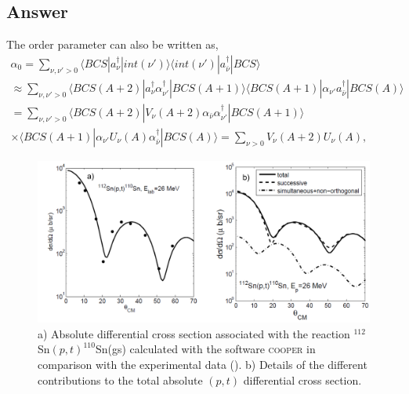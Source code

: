 \subsection*{Answer}
The order parameter can also be written as,
\begin{multline}
\alpha_0=\sum_{\nu,\nu'>0}\langle BCS |a^\dagger_{\nu}|int(\nu')\rangle\langle int(\nu')|a^\dagger_{\bar\nu}|BCS\rangle\\
\approx\sum_{\nu,\nu'>0}\langle BCS (A+2) |a^\dagger_{\nu}\alpha^\dagger_{\nu'}|BCS (A+1)\rangle\langle BCS (A+1)|\alpha_{\nu'}a^\dagger_{\bar\nu}|BCS (A)\rangle \\
=\sum_{\nu,\nu'>0}\langle BCS(A+2) |V_\nu(A+2)\alpha_{\bar\nu}\alpha^\dagger_{\nu'}|BCS(A+1)\rangle\\
\times\langle BCS(A+1)|\alpha_{\nu'}U_\nu(A)\alpha^\dagger_{\bar\nu}|BCS(A)\rangle
=\sum_{\nu>0}V_\nu(A+2)U_{\nu}(A),
\end{multline}
\begin{figure}
\centerline{\includegraphics*[width=\textwidth,angle=0]{nutshell/figs/fig2A2.pdf}}
\caption{a) Absolute differential cross section associated with the reaction $^{112}$Sn$(p,t)^{110}$Sn(gs) calculated with the software \textsc{cooper} in comparison with the experimental data (\cite{Guazzoni:06}). b) Details of the different contributions to the total absolute $(p,t)$ differential cross section.}\label{fig_2A2}
\end{figure}
